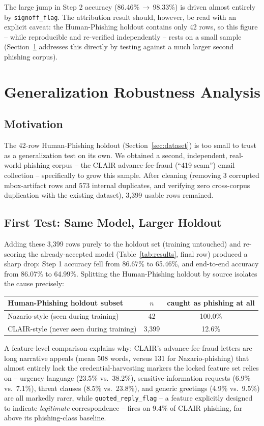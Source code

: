 \documentclass[11pt]{article}
\begin{document}
The large jump in Step 2 accuracy (86.46\%\,$\rightarrow$\,98.33\%) is driven almost entirely by
\texttt{signoff\_flag}. The attribution result should, however, be read with an explicit caveat:
the Human-Phishing holdout contains only 42 rows, so this figure -- while reproducible and
re-verified independently -- rests on a small sample (Section~\ref{sec:generalization} addresses
this directly by testing against a much larger second phishing corpus).

\section{Generalization Robustness Analysis}
\label{sec:generalization}
\subsection{Motivation}
The 42-row Human-Phishing holdout (Section~\ref{sec:dataset}) is too small to trust as a
generalization test on its own. We obtained a second, independent, real-world phishing corpus --
the CLAIR advance-fee-fraud (``419 scam'') email collection -- specifically to grow this sample.
After cleaning (removing 3 corrupted mbox-artifact rows and 573 internal duplicates, and verifying
zero cross-corpus duplication with the existing dataset), 3{,}399 usable rows remained.

\subsection{First Test: Same Model, Larger Holdout}
Adding these 3{,}399 rows purely to the holdout set (training untouched) and re-scoring the
already-accepted model (Table~\ref{tab:results}, final row) produced a sharp drop: Step 1
accuracy fell from 86.67\% to 65.46\%, and end-to-end accuracy from 86.07\% to 64.99\%. Splitting
the Human-Phishing holdout by source isolates the cause precisely:
\begin{center}
\begin{tabular}{@{}lcc@{}}
\toprule
Human-Phishing holdout subset & $n$ & caught as phishing at all \\
\midrule
Nazario-style (seen during training) & 42 & 100.0\% \\
CLAIR-style (never seen during training) & 3{,}399 & 12.6\% \\
\bottomrule
\end{tabular}
\end{center}
A feature-level comparison explains why: CLAIR's advance-fee-fraud letters are long narrative
appeals (mean 508 words, versus 131 for Nazario-phishing) that almost entirely lack the
credential-harvesting markers the locked feature set relies on -- urgency language (23.5\% vs.\
38.2\%), sensitive-information requests (6.9\% vs.\ 7.1\%), threat clauses (8.5\% vs.\ 23.8\%),
and generic greetings (4.9\% vs.\ 9.5\%) are all markedly rarer, while \texttt{quoted\_reply\_flag}
-- a feature explicitly designed to indicate \emph{legitimate} correspondence -- fires on 9.4\% of
CLAIR phishing, far above its phishing-class baseline.
\end{document}
